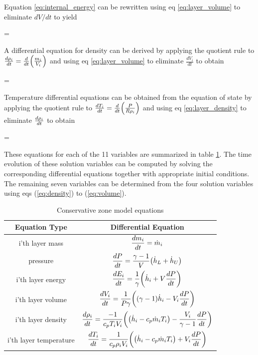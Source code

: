 Equation \ref{eq:internal_energy} can be rewritten using eq \ref{eq:layer_volume} to eliminate $dV/dt$ to yield

\be {} =   \ee

A differential equation for density can be derived by applying the quotient rule to $\frac{d \rho_i}{dt} = \frac{d}{dt} { \left( {\frac{m_i}{V_i}} \right) }$ and using eq \ref{eq:layer_volume} to eliminate $\frac{dV_i}{dt}$ to obtain

\be {} =   \label{eq:layer_density}\ee

Temperature differential equations can be obtained from the equation of state by applying the quotient rule to $\frac{d {T_i}}{dt} = \frac{d {}}{dt} { \left( {\frac{P}{R \rho_i}} \right) }$ and using eq \ref{eq:layer_density} to eliminate $\frac{d {\rho_i}}{dt}$ to obtain

\be {} =   \ee

These equations for each of the 11 variables are summarized in table \ref{tab:zone_model_equations}. The time evolution of
these solution variables can be computed by solving the corresponding differential equations
together with appropriate initial conditions. The remaining seven variables can be determined
from the four solution variables using eqs (\ref{eq:density}) to (\ref{eq:volume}).

\begin{table}
\begin{center}
\caption{Conservative zone model equations}
\label{tab:zone_model_equations}
\vspace{0.1in}
\begin{tabular}{|c|c|}
\hline
Equation Type & Differential Equation \\ \hline
i'th layer mass & $\displaystyle {\frac{d {m_i}}{dt} = \dot m_i}$ \\ \hline
pressure & $\displaystyle {\frac{d {P}}{dt} = \frac{{\gamma -1}}{{V}}  { \left( {\dot h_L + \dot h_U} \right) } }$ \\ \hline
i'th layer energy & $\displaystyle {\frac{d {E_i}}{dt} = \frac{1}{\gamma}  { \left( {\dot h_i + V \frac{d {P}}{dt}} \right) } }$ \\ \hline
i'th layer volume & $\displaystyle {\frac{d {V_i}}{dt} = \frac{1}{P \gamma}  { \left( { { \left( {\gamma -1} \right) }  \dot h_i - V_i \frac{d {P}}{dt}} \right) }  }$ \\ \hline
i'th layer density & $\displaystyle {\frac{d {\rho_i}}{dt} = \frac{-1}{c_p T_i V_i}  { \left( { { \left( {\dot h_i - c_p \dot m_i T_i} \right) }  - \frac{V_i}{\gamma - 1}\frac{d {P}}{dt}} \right) } }$ \\ \hline
i'th layer temperature & $\displaystyle {\frac{d {T_i}}{dt} = \frac{1}{c_p \rho_i V_i}  { \left( { { \left( {\dot h_i - c_p \dot m_i T_i} \right) } + V_i \frac{d {P}}{dt}} \right) } }$ \\ \hline
\end{tabular}
\end{center}
\end{table}

